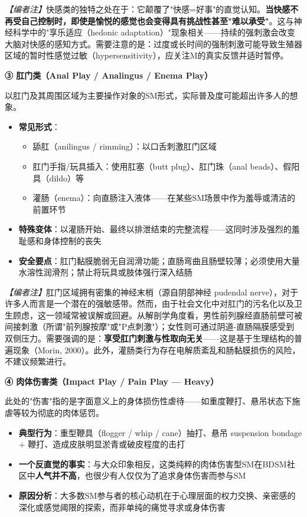 \documentclass[12pt,UTF8]{ctexbook}
\begin{document}
\textit{【编者注】}快感类的独特之处在于：它颠覆了"快感=好事"的直觉认知。\textbf{当快感不再受自己控制时，即使是愉悦的感觉也会变得具有挑战性甚至"难以承受"}。这与神经科学中的"享乐适应（hedonic adaptation）"现象相关——持续的强刺激会改变大脑对快感的感知方式。需要注意的是：过度或长时间的强制刺激可能导致生殖器区域的暂时性感觉过敏（hypersensitivity），应关注M的真实反馈并适时暂停。

\noindent\textbf{③ 肛门类（Anal Play / Analingus / Enema Play）}

以肛门及其周围区域为主要操作对象的SM形式，实际普及度可能超出许多人的想象。

\begin{itemize}
	\item \textbf{常见形式}：
	\begin{itemize}
		\item 舔肛（anilingus / rimming）：以口舌刺激肛门区域
		\item 肛门手指/玩具插入：使用肛塞（butt plug）、肛门珠（anal beads）、假阳具（dildo）等
		\item 灌肠（enema）：向直肠注入液体——在某些SM场景中作为羞辱或清洁的前置环节
	\end{itemize}
	\item \textbf{特殊变体}：以灌肠开始、最终以排泄结束的完整流程——这同时涉及强烈的羞耻感和身体控制的丧失
	\item \textbf{安全要点}：肛门黏膜脆弱无自润滑功能；直肠弯曲且肠壁较薄；必须使用大量水溶性润滑剂；禁止将玩具或肢体强行深入结肠
\end{itemize}

\textit{【编者注】}肛门区域拥有密集的神经末梢（源自阴部神经 pudendal nerve），对于许多人而言是一个潜在的强敏感带。然而，由于社会文化中对肛门的污名化以及卫生顾虑，这一领域常被误解或回避。从解剖学角度看，男性前列腺经直肠前壁可被间接刺激（所谓"前列腺按摩"或"P点刺激"）；女性则可通过阴道-直肠隔膜感受到双侧压力。需要强调的是：\textbf{享受肛门刺激与性取向无关}——这是基于生理结构的普遍现象（Morin, 2000）。此外，灌肠类行为存在电解质紊乱和肠黏膜损伤的风险，不建议频繁进行。

\noindent\textbf{④ 肉体伤害类（Impact Play / Pain Play — Heavy）}

此处的"伤害"指的是字面意义上的身体损伤性虐待——如重度鞭打、悬吊状态下施虐等较为彻底的肉体惩罚。

\begin{itemize}
	\item \textbf{典型行为}：重型鞭具（flogger / whip / cane）抽打、悬吊 suspension bondage + 鞭打、造成皮肤明显淤青或破皮程度的击打
	\item \textbf{一个反直觉的事实}：与大众印象相反，这类纯粹的肉体伤害型SM在BDSM社区中\textbf{人气并不高}，也很少有人仅仅为了追求身体伤害而参与SM
	\item \textbf{原因分析}：大多数SM参与者的核心动机在于心理层面的权力交换、亲密感的深化或感觉阈限的探索，而非单纯的痛觉寻求或身体伤害
\end{itemize}
\end{document}
